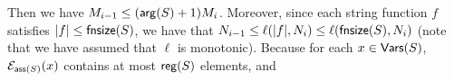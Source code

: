 %
%		
%		
%		
%		
%		
%
%
%
Then we have $M_{i-1} \le (\mathsf{arg}(S)+1)M_i $. Moreover, since each string function $f$ satisfies   $|f| \le \mathsf{fnsize}(S)$, we have that $N_{i-1} \le \ell(|f|, N_i) \le \ell(\mathsf{fnsize}(S), N_i)$ (note that we have assumed that $\ell$ is monotonic). Because for each $x \in \mathsf{Vars}(S)$, $\mathcal{E}_{\mathsf{ass}(S)}(x)$ contains at most $\mathsf{reg}(S)$ elements, and 
